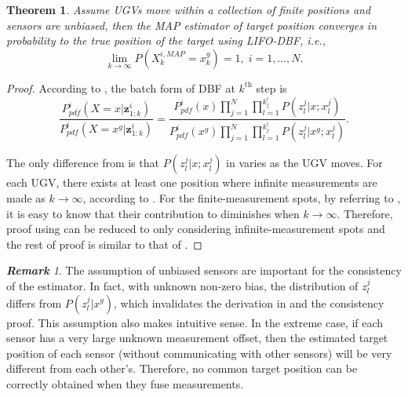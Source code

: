 \documentclass[journal]{IEEEtranTIE}
\newtheorem{thm}{\bfseries Theorem}
\theoremstyle{remark}
\newtheorem{rem}{\bfseries Remark}
\newcommand{\X}{X}
\newcommand{\xg}{x^g}
\begin{document}
	\begin{thm}\label{thm:LIFO-dbf-mov-sen}
		Assume UGVs move within a collection of finite positions and sensors are unbiased, then the MAP estimator of target position converges in probability to the true position of the target using LIFO-DBF, i.e.,
		\small\begin{equation*}
			\lim\limits_{k\rightarrow \infty}
			P(\X^{i,MAP}_k=\xg_k)=1,\;i=1,\dots,N.
		\end{equation*}\normalsize
	\end{thm}
	
	\begin{proof}
		According to , the batch form of DBF at $k^\text{th}$ step is
		\small\begin{equation}\label{eqn:cmp2}
			\frac{P^i_{pdf}(\X=x|\mathbf{z}^i_{1:k})}{P^i_{pdf}(\X=\xg|\mathbf{z}^i_{1:k})}=\frac{P^i_{pdf}(x)\prod\limits_{j=1}^{N}\prod\limits_{l=1}^{k^i_j}P(z^j_l|x;x^j_l)}{P^i_{pdf}(\xg)\prod\limits_{j=1}^{N}\prod\limits_{l=1}^{k^i_j}P(z^j_l|\xg;x^j_l)}.
		\end{equation}\normalsize
		
		The only difference from  is that $P(z^j_l|x;x^j_l)$ in  varies as the UGV moves. 
		For each UGV, there exists at least one position where infinite measurements are made as $k\rightarrow \infty$, according to . 
		For the finite-measurement spots, by referring to , it is easy to know that their contribution to  diminishes when $k\rightarrow \infty$.
		Therefore, proof using  can be reduced to only considering infinite-measurement spots and the rest of proof is similar to that of .
	\end{proof}
	
	\begin{rem}
		The assumption of unbiased sensors are important for the consistency of the estimator. In fact, with unknown non-zero bias, the distribution of $z^j_l$ differs from $P(z^j_l|\xg)$, which invalidates the derivation in  and the consistency proof. 
		This assumption also makes intuitive sense.
		In the extreme case, if each sensor has a very large unknown measurement offset, then the estimated target position of each sensor (without communicating with other sensors) will be very different from each other's.
		Therefore, no common target position can be correctly obtained when they fuse measurements.
	\end{rem}
	\medskip
	
\end{document}
